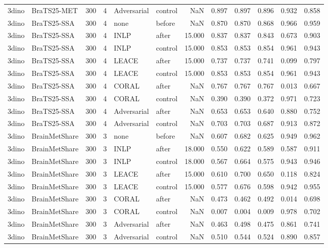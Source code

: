 \begin{tabular}{llrrllrrrrrr}
3dino & BraTS25-MET & 300 & 4 & Adversarial & control & NaN & 0.897 & 0.897 & 0.896 & 0.932 & 0.858 \\
3dino & BraTS25-SSA & 300 & 4 & none & before & NaN & 0.870 & 0.870 & 0.868 & 0.966 & 0.959 \\
3dino & BraTS25-SSA & 300 & 4 & INLP & after & 15.000 & 0.837 & 0.837 & 0.843 & 0.673 & 0.903 \\
3dino & BraTS25-SSA & 300 & 4 & INLP & control & 15.000 & 0.853 & 0.853 & 0.854 & 0.961 & 0.943 \\
3dino & BraTS25-SSA & 300 & 4 & LEACE & after & 15.000 & 0.737 & 0.737 & 0.741 & 0.099 & 0.797 \\
3dino & BraTS25-SSA & 300 & 4 & LEACE & control & 15.000 & 0.853 & 0.853 & 0.854 & 0.961 & 0.943 \\
3dino & BraTS25-SSA & 300 & 4 & CORAL & after & NaN & 0.767 & 0.767 & 0.767 & 0.013 & 0.667 \\
3dino & BraTS25-SSA & 300 & 4 & CORAL & control & NaN & 0.390 & 0.390 & 0.372 & 0.971 & 0.723 \\
3dino & BraTS25-SSA & 300 & 4 & Adversarial & after & NaN & 0.653 & 0.653 & 0.640 & 0.880 & 0.752 \\
3dino & BraTS25-SSA & 300 & 4 & Adversarial & control & NaN & 0.703 & 0.703 & 0.687 & 0.913 & 0.872 \\
3dino & BrainMetShare & 300 & 3 & none & before & NaN & 0.607 & 0.682 & 0.625 & 0.949 & 0.962 \\
3dino & BrainMetShare & 300 & 3 & INLP & after & 18.000 & 0.550 & 0.622 & 0.589 & 0.587 & 0.911 \\
3dino & BrainMetShare & 300 & 3 & INLP & control & 18.000 & 0.567 & 0.664 & 0.575 & 0.943 & 0.946 \\
3dino & BrainMetShare & 300 & 3 & LEACE & after & 15.000 & 0.610 & 0.700 & 0.650 & 0.118 & 0.824 \\
3dino & BrainMetShare & 300 & 3 & LEACE & control & 15.000 & 0.577 & 0.676 & 0.598 & 0.942 & 0.955 \\
3dino & BrainMetShare & 300 & 3 & CORAL & after & NaN & 0.473 & 0.462 & 0.492 & 0.014 & 0.698 \\
3dino & BrainMetShare & 300 & 3 & CORAL & control & NaN & 0.007 & 0.004 & 0.009 & 0.978 & 0.702 \\
3dino & BrainMetShare & 300 & 3 & Adversarial & after & NaN & 0.463 & 0.498 & 0.475 & 0.861 & 0.741 \\
3dino & BrainMetShare & 300 & 3 & Adversarial & control & NaN & 0.510 & 0.544 & 0.524 & 0.890 & 0.857 \\

\end{tabular}
